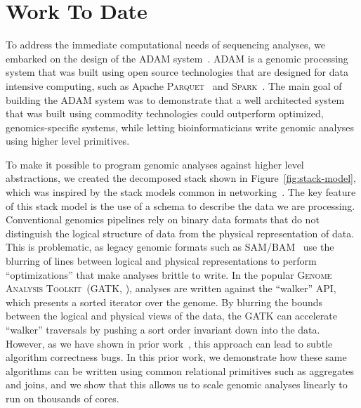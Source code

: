 \documentclass[11pt]{article} %
\begin{document}
\section{Work To Date}

To address the immediate computational needs of sequencing analyses, we embarked on the design of
the \textsc{ADAM} system~\cite{massie13, nothaft15}. \textsc{ADAM} is a genomic processing system
that was built using open source technologies that are designed for data intensive computing, such
as Apache \textsc{Parquet}~\cite{parquet} and \textsc{Spark}~\cite{zaharia12, zaharia10}. The main
goal of building the \textsc{ADAM} system was to demonstrate that a well architected system that
was built using commodity technologies could outperform optimized, genomics-specific systems,
while letting bioinformaticians write genomic analyses using higher level primitives.

To make it possible to program genomic analyses against higher level abstractions, we created the
decomposed stack shown in Figure~\ref{fig:stack-model}, which was inspired by the stack models
common in networking~\cite{zimmermann80}. The key feature of this stack model is the use of a
schema to describe the data we are processing. Conventional genomics pipelines rely on binary
data formats that do not distinguish the logical structure of data from the physical representation
of data. This is problematic, as legacy genomic formats such as SAM/BAM~\cite{li09} use the
blurring of lines between logical and physical representations to perform ``optimizations''
that make analyses brittle to write. In the popular \textsc{Genome Analysis Toolkit}~(GATK,
\cite{mckenna10}), analyses are written against the ``walker'' API, which presents a sorted
iterator over the genome. By blurring the bounds between the logical and physical views of the
data, the \textsc{GATK} can accelerate ``walker'' traversals by pushing a sort order invariant
down into the data. However, as we have shown in prior work~\cite{nothaft15}, this approach
can lead to subtle algorithm correctness bugs. In this prior work, we demonstrate how these
same algorithms can be written using common relational primitives such as aggregates and joins,
and we show that this allows us to scale genomic analyses linearly to run on thousands of cores.
\end{document}
